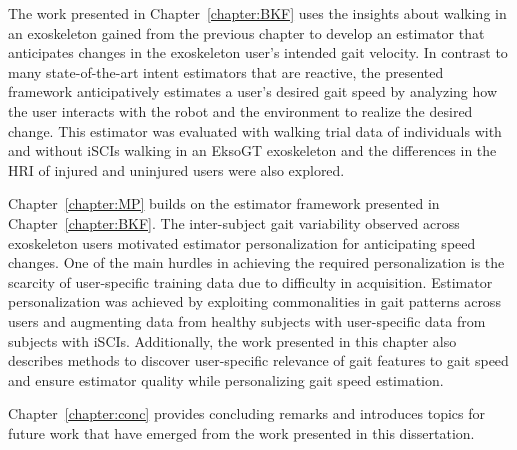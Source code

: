 The work presented in Chapter~\ref{chapter:BKF} uses the insights about walking in an exoskeleton gained from the previous chapter to develop an estimator that anticipates changes in the exoskeleton user’s intended gait velocity. In contrast to many state-of-the-art intent estimators that are reactive, the presented framework anticipatively estimates a user's desired gait speed by analyzing how the user interacts with the robot and the environment to realize the desired change. This estimator was evaluated with walking trial data of	individuals with and without iSCIs walking in an EksoGT exoskeleton and the differences in the HRI of injured and uninjured users were also explored.

Chapter~\ref{chapter:MP} builds on the estimator framework presented in Chapter~\ref{chapter:BKF}. The inter-subject gait variability observed across exoskeleton users motivated estimator personalization for anticipating speed changes. One of the main hurdles in achieving the required personalization is the scarcity of user-specific training data due to difficulty in acquisition. Estimator personalization was achieved by exploiting commonalities in gait patterns across users and augmenting data from healthy subjects with user-specific data from subjects with iSCIs. Additionally, the work presented in this chapter also describes methods to discover user-specific relevance of gait features to gait speed and ensure estimator quality while personalizing gait speed estimation.

Chapter~\ref{chapter:conc} provides concluding remarks and introduces topics for future work that have emerged from the work presented in this dissertation.

